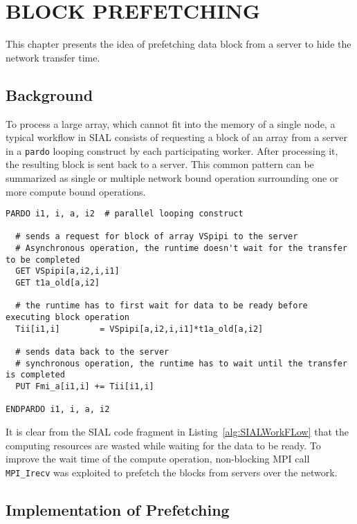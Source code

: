 \chapter{BLOCK PREFETCHING}\label{block prefetching}

This chapter presents the idea of prefetching data block from a server to hide the
network transfer time.

\section{Background}\label{prefetchingbackground}
To process a large array, which cannot fit into the memory of a single node, a typical
workflow in SIAL consists of requesting a block of an array from a server in a
\texttt{pardo} looping construct by each participating worker. After processing
it, the resulting block is sent back to a server. This common pattern can be
summarized as single or multiple network bound operation surrounding one or more
compute bound operations.

\begin{lstlisting}[caption={Code fragment from ACESIII for CCSD calculation},
  label={alg:SIALWorkFLow}]
PARDO i1, i, a, i2  # parallel looping construct

  # sends a request for block of array VSpipi to the server
  # Asynchronous operation, the runtime doesn't wait for the transfer to be completed
  GET VSpipi[a,i2,i,i1]
  GET t1a_old[a,i2]

  # the runtime has to first wait for data to be ready before executing block operation
  Tii[i1,i]        = VSpipi[a,i2,i,i1]*t1a_old[a,i2]

  # sends data back to the server
  # synchronous operation, the runtime has to wait until the transfer is completed
  PUT Fmi_a[i1,i] += Tii[i1,i]

ENDPARDO i1, i, a, i2
\end{lstlisting}

It is clear from the SIAL code fragment in Listing~\ref{alg:SIALWorkFLow} that the computing resources are wasted while
waiting for the data to be ready. To improve the wait time of the compute
operation, non-blocking MPI call \texttt{MPI\_Irecv} was exploited to prefetch
the blocks from servers over the network.

\section{Implementation of Prefetching}

